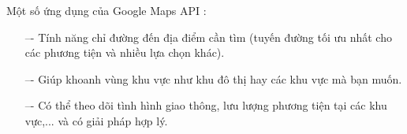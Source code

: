 Một số ứng dụng của Google Maps API :
\begin{itemize}
    \item[–-] Tính năng chỉ đường đến địa điểm cần tìm (tuyến đường tối ưu nhất cho các phương tiện và nhiều lựa chọn khác).
    \item[–-] Giúp khoanh vùng khu vực như khu đô thị hay các khu vực mà bạn muốn.
    \item[–-] Có thể theo dõi tình hình giao thông, lưu lượng phương tiện tại các khu vực,... và có giải pháp hợp lý.
\end{itemize}
